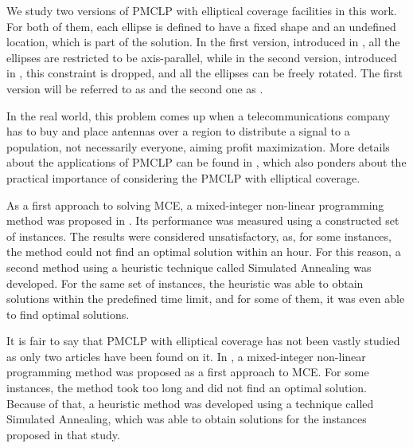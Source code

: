 We study two versions of PMCLP with elliptical coverage facilities in this work. For both of them, each ellipse is defined to have a fixed shape and an undefined location, which is part of the solution.
In the first version, introduced in \cite{canbolat}, all the ellipses are restricted to be axis-parallel, while in the second version, introduced in \cite{andreta}, this constraint is dropped, and all the ellipses can be freely rotated.
The first version will be referred to as  and the second one as  .

{\color{Green}
	In the real world, this problem comes up when a telecommunications company has to buy and place antennas over a region to distribute a signal to a population, not necessarily everyone, aiming profit maximization. 
	More details about the applications of PMCLP can be found in \cite{canbolat}, which also ponders about the practical importance of considering the PMCLP with elliptical coverage.
	
	As a first approach to solving MCE, a mixed-integer non-linear programming method was proposed in \cite{canbolat}. 
	Its performance was measured using a constructed set of instances. The results were considered unsatisfactory, as, for some instances, the method could not find an optimal solution within an hour. 
	For this reason, a second method using a heuristic technique called Simulated Annealing was developed. For the same set of instances, the heuristic was able to obtain solutions within the predefined time limit, and for some of them, it was even able to find optimal solutions.
}

{\color{Red}
It is fair to say that PMCLP with elliptical coverage has not been vastly studied as only two articles have been found on it. In , a mixed-integer non-linear programming method was proposed as a first approach to MCE. For some instances, the method took too long and did not find an optimal solution. Because of that, a heuristic method was developed using a technique called Simulated Annealing, which was able to obtain solutions for the instances proposed in that study.
}

